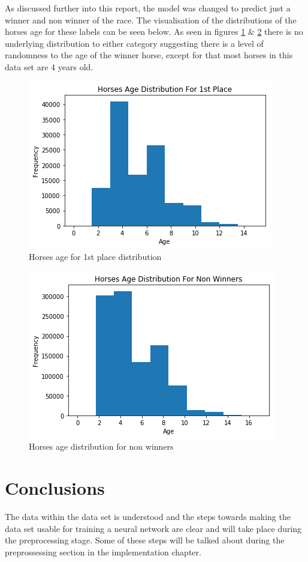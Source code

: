 As discussed further into this report, the model was changed to predict just a winner and non winner of the race. The visualisation of the distributions of the horses age for these labels can be seen below. As seen in figures \ref{fig:hawd} \& \ref{fig:hald} there is no underlying distribution to either category suggesting there is a level of randomness to the age of the winner horse, except for that most horses in this data set are 4 years old. 
\begin{figure}[H]
  \centering
  \includegraphics[width =(\textwidth)/2]{winnersAgeDistro.png}
  \caption{Horses age for 1st place distribution}
  \label{fig:hawd}
\end{figure}
\begin{figure}[H]
  \centering
  \includegraphics[width =(\textwidth)/2]{download.png}
  \caption{Horses age distribution for non winners}
  \label{fig:hald}
\end{figure}

\section{Conclusions}
The data within the data set is understood and the steps towards making the data set usable for training a neural network are clear and will take place during the preprocessing stage. Some of these steps will be talked about during the preprossessing section in the implementation chapter.

